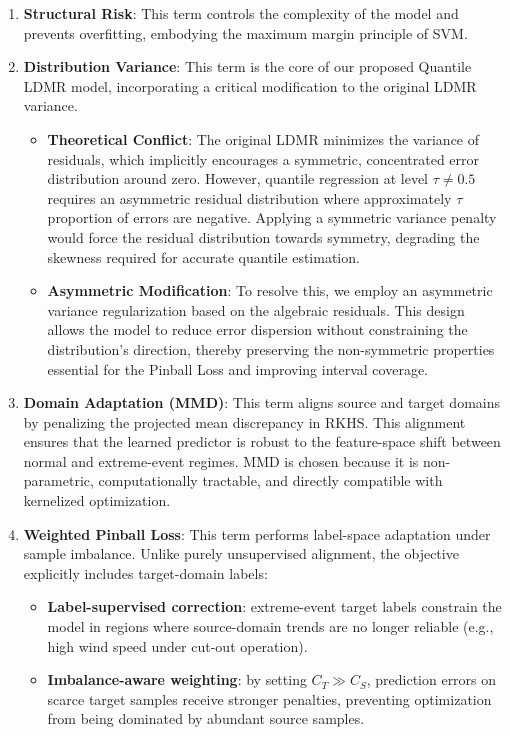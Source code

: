 \documentclass[a4paper]{cas-sc}
\begin{document}
\begin{enumerate}
    \item \textbf{Structural Risk}: This term controls the complexity of the model and prevents overfitting, embodying the maximum margin principle of SVM.
    \item \textbf{Distribution Variance}: This term is the core of our proposed Quantile LDMR model, incorporating a critical modification to the original LDMR variance.
    \begin{itemize}
        \item \textbf{Theoretical Conflict}: The original LDMR minimizes the variance of residuals, which implicitly encourages a symmetric, concentrated error distribution around zero. However, quantile regression at level $\tau \neq 0.5$ requires an asymmetric residual distribution where approximately $\tau$ proportion of errors are negative. Applying a symmetric variance penalty would force the residual distribution towards symmetry, degrading the skewness required for accurate quantile estimation.
        \item \textbf{Asymmetric Modification}: To resolve this, we employ an asymmetric variance regularization based on the algebraic residuals. This design allows the model to reduce error dispersion without constraining the distribution's direction, thereby preserving the non-symmetric properties essential for the Pinball Loss and improving interval coverage.
    \end{itemize}
    \item \textbf{Domain Adaptation (MMD)}: This term aligns source and target domains by penalizing the projected mean discrepancy in RKHS. This alignment ensures that the learned predictor is robust to the feature-space shift between normal and extreme-event regimes. MMD is chosen because it is non-parametric, computationally tractable, and directly compatible with kernelized optimization.
    \item \textbf{Weighted Pinball Loss}: This term performs label-space adaptation under sample imbalance. Unlike purely unsupervised alignment, the objective explicitly includes target-domain labels:
    \begin{itemize}
        \item \textbf{Label-supervised correction}: extreme-event target labels constrain the model in regions where source-domain trends are no longer reliable (e.g., high wind speed under cut-out operation).
        \item \textbf{Imbalance-aware weighting}: by setting $C_T \gg C_S$, prediction errors on scarce target samples receive stronger penalties, preventing optimization from being dominated by abundant source samples.
    \end{itemize}
\end{enumerate}
\end{document}
